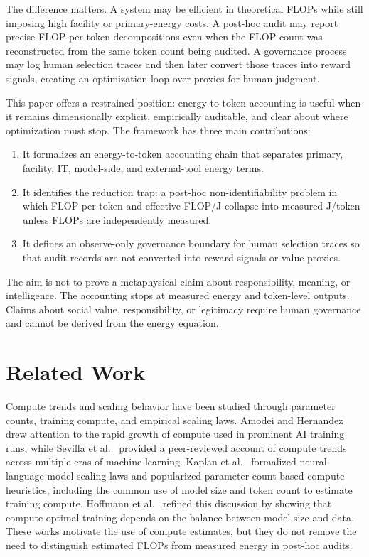 \documentclass[11pt]{article}
\begin{document}
The difference matters. A system may be efficient in theoretical FLOPs while still imposing high facility or primary-energy costs. A post-hoc audit may report precise FLOP-per-token decompositions even when the FLOP count was reconstructed from the same token count being audited. A governance process may log human selection traces and then later convert those traces into reward signals, creating an optimization loop over proxies for human judgment.

This paper offers a restrained position: energy-to-token accounting is useful when it remains dimensionally explicit, empirically auditable, and clear about where optimization must stop. The framework has three main contributions:

\begin{enumerate}
  \item It formalizes an energy-to-token accounting chain that separates primary, facility, IT, model-side, and external-tool energy terms.
  \item It identifies the reduction trap: a post-hoc non-identifiability problem in which FLOP-per-token and effective FLOP/J collapse into measured J/token unless FLOPs are independently measured.
  \item It defines an observe-only governance boundary for human selection traces so that audit records are not converted into reward signals or value proxies.
\end{enumerate}

The aim is not to prove a metaphysical claim about responsibility, meaning, or intelligence. The accounting stops at measured energy and token-level outputs. Claims about social value, responsibility, or legitimacy require human governance and cannot be derived from the energy equation.

\section{Related Work}

Compute trends and scaling behavior have been studied through parameter counts, training compute, and empirical scaling laws. Amodei and Hernandez~\cite{amodei2018ai} drew attention to the rapid growth of compute used in prominent AI training runs, while Sevilla et al.~\cite{sevilla2022compute} provided a peer-reviewed account of compute trends across multiple eras of machine learning. Kaplan et al.~\cite{kaplan2020scaling} formalized neural language model scaling laws and popularized parameter-count-based compute heuristics, including the common use of model size and token count to estimate training compute. Hoffmann et al.~\cite{hoffmann2022training} refined this discussion by showing that compute-optimal training depends on the balance between model size and data. These works motivate the use of compute estimates, but they do not remove the need to distinguish estimated FLOPs from measured energy in post-hoc audits.
\end{document}
